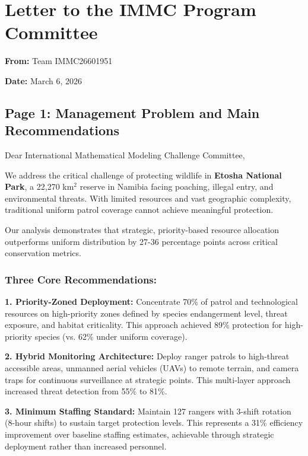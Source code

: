 \section*{Letter to the IMMC Program Committee}

\vspace{0.5cm}

\textbf{From:} Team IMMC26601951

\textbf{Date:} March 6, 2026

\vspace{0.5cm}

\subsection*{Page 1: Management Problem and Main Recommendations}

Dear International Mathematical Modeling Challenge Committee,

We address the critical challenge of protecting wildlife in \textbf{Etosha National Park}, a 22,270 km$^2$ reserve in Namibia facing poaching, illegal entry, and environmental threats. With limited resources and vast geographic complexity, traditional uniform patrol coverage cannot achieve meaningful protection.

Our analysis demonstrates that strategic, priority-based resource allocation outperforms uniform distribution by 27-36 percentage points across critical conservation metrics.

\subsubsection*{Three Core Recommendations:}

\noindent \textbf{1. Priority-Zoned Deployment:} Concentrate 70\% of patrol and technological resources on high-priority zones defined by species endangerment level, threat exposure, and habitat criticality. This approach achieved 89\% protection for high-priority species (vs. 62\% under uniform coverage).

\noindent \textbf{2. Hybrid Monitoring Architecture:} Deploy ranger patrols to high-threat accessible areas, unmanned aerial vehicles (UAVs) to remote terrain, and camera traps for continuous surveillance at strategic points. This multi-layer approach increased threat detection from 55\% to 81\%.

\noindent \textbf{3. Minimum Staffing Standard:} Maintain 127 rangers with 3-shift rotation (8-hour shifts) to sustain target protection levels. This represents a 31\% efficiency improvement over baseline staffing estimates, achievable through strategic deployment rather than increased personnel.


